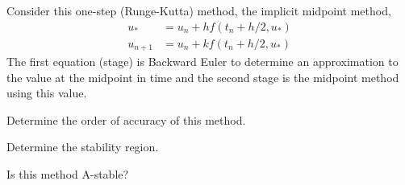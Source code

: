 \documentclass[minion]{homework}
\begin{document}
\begin{problems}
\problem Consider this one-step (Runge-Kutta) method, the 
implicit midpoint method,
\begin{equation}
\begin{aligned}
u_* &= u_n + h f(t_n+h/2,u_*) \\
u_{n+1} &=  u_n + k f(t_n+h/2,u_*)
\end{aligned}
\end{equation}
The first equation (stage) is Backward Euler to determine an approximation to the value at the midpoint in time and the second stage is the midpoint method using this value.
\begin{subproblems}
\item Determine the order of accuracy of this method.
\item Determine the stability region.
\item Is this method A-stable? 
\end{subproblems}
\end{problems}
\end{document}
